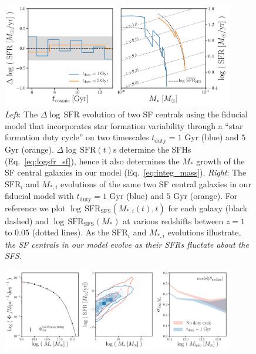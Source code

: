 \documentclass[12pt, letterpaper, preprint]{aastex}
\newcommand{\logsfr}{\log \, \mathrm{SFR}}
\newcommand{\musfms}{\log\,\overline{\mathrm{SFR}}_\mathrm{SFS}}
\begin{document}
\begin{figure}
\begin{center}
\includegraphics[width=0.9\textwidth]{figs/sfh_pedagogical.pdf}
    \caption{\emph{Left}: The $\Delta \logsfr$ evolution of two SF centrals
    using the fiducial model that incorporates star formation variability through 
    a ``star formation duty cycle'' on two timescales $t_\mathrm{duty} = 1$ Gyr 
    (blue) and $5$ Gyr (orange). $\Delta \logsfr(t)$s determine the SFHs
    (Eq.~\ref{eq:logsfr_sf}), hence it also determines the $M_*$ growth 
    of the SF central galaxies in our model (Eq.~\ref{eq:integ_mass}).  
    \emph{Right}: The $\mathrm{SFR}_i$ and $M_{*,i}$ evolutions of the same two 
    SF central galaxies in our fiducial model with $t_\mathrm{duty} = 1$ Gyr (blue) 
    and $5$ Gyr (orange). For reference we plot $\musfms(M_{*,i}(t), t)$ for 
    each galaxy (black dashed) and $\musfms(M_*)$ at various redshifts between 
    $z = 1$ to $0.05$ (dotted lines). As the $\mathrm{SFR}_i$ and $M_{*,i}$ 
    evolutions illustrate, \emph{the SF centrals in our model evolve as their SFRs 
    fluctate about the SFS.}} \label{fig:sfh_model}
\end{center}
\end{figure}


\begin{figure}
\begin{center}
\includegraphics[width=0.9\textwidth]{figs/qaplot_abc.pdf}
\caption{}
\label{fig:abc_demo}
\end{center}
\end{figure}
\end{document}
